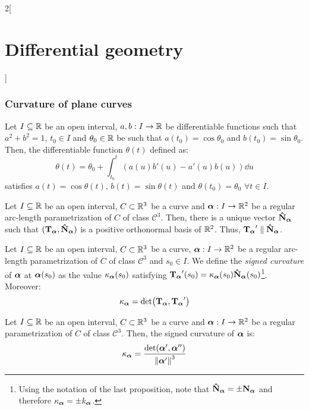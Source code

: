 \documentclass[../../../main.tex]{subfiles}
\begin{document}
\begin{multicols}{2}[\section{Differential geometry}]
  \subsubsection{Curvature of plane curves}
  \begin{lemma}
    Let $I\subseteq\mathbb{R}$ be an open interval, $a,b:I\rightarrow\mathbb{R}$ be differentiable functions such that $a^2+b^2=1$, $t_0\in I$ and $\theta_0\in\mathbb{R}$ be such that $a(t_0)=\cos\theta_0$ and $b(t_0)=\sin\theta_0$. Then, the differentiable function $\theta(t)$ defined as:
    $$\theta(t)=\theta_0+\int_{t_0}^t\left(a(u)b'(u)-a'(u)b(u)\right)\dd{u}$$
    satisfies $a(t)=\cos\theta(t)$, $b(t)=\sin\theta(t)$ and $\theta(t_0)=\theta_0$ $\forall t\in I$.
  \end{lemma}
  \begin{proposition}
    Let $I\subseteq\mathbb{R}$ be an open interval, $C\subset\mathbb{R}^3$ be a curve and $\boldsymbol{\mathrm{\alpha}}:I\rightarrow\mathbb{R}^2$ be a regular arc-length parametrization of $C$ of class $\mathcal{C}^3$. Then, there is a unique vector $\boldsymbol{\mathrm{\hat{N}}}_{\boldsymbol{\mathrm{\alpha}}}$ such that $({\boldsymbol{\mathrm{T}}_{\boldsymbol{\mathrm{\alpha}}}},\boldsymbol{\mathrm{\hat{N}}}_{\boldsymbol{\mathrm{\alpha}}})$ is a positive orthonormal basis of $\mathbb{R}^2$. Thus, ${\boldsymbol{\mathrm{T}}_{\boldsymbol{\mathrm{\alpha}}}}'\parallel \boldsymbol{\mathrm{\hat{N}}}_{\boldsymbol{\mathrm{\alpha}}}$.
  \end{proposition}
  \begin{definition}
    Let $I\subseteq\mathbb{R}$ be an open interval, $C\subset\mathbb{R}^3$ be a curve, $\boldsymbol{\mathrm{\alpha}}:I\rightarrow\mathbb{R}^2$ be a regular arc-length parametrization of $C$ of class $\mathcal{C}^3$ and $s_0\in I$. We define the \emph{signed curvature} of $\boldsymbol{\mathrm{\alpha}}$ at $\boldsymbol{\mathrm{\alpha}}(s_0)$ as the value ${\kappa_{\boldsymbol{\mathrm{\boldsymbol{\mathrm{\alpha}}}}}}(s_0)$ satisfying ${\boldsymbol{\mathrm{T}}_{\boldsymbol{\mathrm{\alpha}}}}'(s_0)={\kappa_{\boldsymbol{\mathrm{\boldsymbol{\mathrm{\alpha}}}}}}(s_0)\boldsymbol{\mathrm{\hat{N}}}_{\boldsymbol{\mathrm{\alpha}}}(s_0)$\footnote{Using the notation of the last proposition, note that $\boldsymbol{\mathrm{\hat{N}}}_{\boldsymbol{\mathrm{\alpha}}}=\pm{\boldsymbol{\mathrm{N}}_{\boldsymbol{\mathrm{\alpha}}}}$ and therefore ${\kappa_{\boldsymbol{\mathrm{\boldsymbol{\mathrm{\alpha}}}}}}=\pm k_{\boldsymbol{\mathrm{\alpha}}}$.}. Moreover: $${\kappa_{\boldsymbol{\mathrm{\boldsymbol{\mathrm{\alpha}}}}}}=\det({\boldsymbol{\mathrm{T}}_{\boldsymbol{\mathrm{\alpha}}}},{\boldsymbol{\mathrm{T}}_{\boldsymbol{\mathrm{\alpha}}}}')$$
  \end{definition}
  \begin{proposition}
    Let $I\subseteq\mathbb{R}$ be an open interval, $C\subset\mathbb{R}^3$ be a curve and $\boldsymbol{\mathrm{\alpha}}:I\rightarrow\mathbb{R}^2$ be a regular parametrization of $C$ of class $\mathcal{C}^3$. Then, the signed curvature of $\boldsymbol{\mathrm{\alpha}}$ is: $${\kappa_{\boldsymbol{\mathrm{\boldsymbol{\mathrm{\alpha}}}}}}=\frac{\det(\boldsymbol{\mathrm{\alpha}}',\boldsymbol{\mathrm{\alpha}}'')}{{\|\boldsymbol{\mathrm{\alpha}}'\|}^3}$$
  \end{proposition}

\end{multicols}
\end{document}
